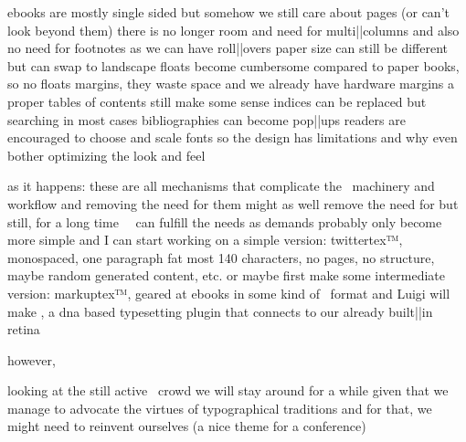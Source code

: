     \FlushStep

    \startitemize
        \startitem ebooks are mostly single sided \FlushStep \stopitem
        \startitem but somehow we still care about pages (or can't look beyond them) \FlushStep \stopitem
        \startitem there is no longer room and need for multi||columns \FlushStep \stopitem
        \startitem and also no need for footnotes as we can have roll||overs \FlushStep \stopitem
        \startitem paper size can still be different but can swap to landscape\FlushStep \stopitem
        \startitem floats become cumbersome compared to paper books, so no floats \FlushStep \stopitem
        \startitem margins, they waste space and we already have hardware margins \FlushStep \stopitem
        \startitem a proper tables of contents still make some sense \FlushStep \stopitem
        \startitem indices can be replaced but searching in most cases \FlushStep \stopitem
        \startitem bibliographies can become pop||ups \FlushStep \stopitem
        \startitem readers are encouraged to choose and scale fonts so the design has limitations \FlushStep \stopitem
        \startitem and why even bother optimizing the look and feel \FlushStep \stopitem
    \stopitemize

\stoptopic

\StopSteps

\StartSteps

\starttopic[title=The future of \TEX]

    \FlushStep

    \startitemize
        \startitem as it happens: these are all mechanisms that complicate the \TEX\ machinery and workflow \FlushStep \stopitem
        \startitem and removing the need for them might as well remove the need for \TEX \FlushStep \stopitem
        \startitem but still, for a long time \CONTEXT\ \MKIV\ can fulfill the needs as demands probably only become more simple \FlushStep \stopitem
        \startitem and I can start working on a simple version: twittertex™, monospaced, one paragraph fat most 140 characters, no pages, no structure, maybe random generated content, etc. \FlushStep \stopitem
        \startitem or maybe first make some intermediate version: markuptex™, geared at ebooks in some kind of \XML\ format \FlushStep \stopitem
        \startitem and Luigi will make , a dna based typesetting plugin that connects to our already built||in retina \FlushStep \stopitem
    \stopitemize

    however, \FlushStep

    \startitemize
        \startitem looking at the still active \TEX\ crowd we will stay around for a while \FlushStep \stopitem
        \startitem given that we manage to advocate the virtues of typographical traditions \FlushStep \stopitem
        \startitem and for that, we might need to reinvent ourselves (a nice theme for a conference) \FlushStep \stopitem
    \stopitemize

\stoptopic

\StopSteps

\stopdocument

